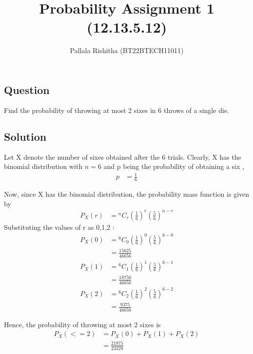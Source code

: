 \documentclass[12pt,twocolumn,notitlepage]{article}
\title{Probability Assignment 1 (12.13.5.12)}
\author{Pallala Rishitha (BT22BTECH11011)}
\date{}
\providecommand{\brak}[1]{\ensuremath{\left(#1\right)}}
\newcommand*{\comb}[2]{{}^{#1}C_{#2}}
\begin{document}
\maketitle
\subsection*{Question}
Find the probability of throwing at most 2 sixes in 6 throws of a single die.\\



\subsection*{Solution}

Let X denote the number of sixes obtained after the 6 trials. Clearly, X has the binomial distribution with $n=6$ and p being the probability of obtaining a six ,
\begin{align}
    p &= \frac{1}{6}      
\end{align}

Now, since X has the binomial distribution, the probability mass function is given by
\begin{align}
    P_X\brak{r} &= \comb{n}{r}\brak{\frac{1}{6}}^{r}\brak{\frac{5}{6}}^{n-r} 
\end{align}
Substituting the values of r as 0,1,2 :
\begin{align}
    P_X\brak{0} &= \comb{6}{0}\brak{\frac{1}{6}}^{0}\brak{\frac{5}{6}}^{6-0} 
\\
   &=\frac{15625}{46656}
\end{align}
\begin{align}
    P_X\brak{1} &= \comb{6}{1}\brak{\frac{1}{6}}^{1}\brak{\frac{5}{6}}^{6-1} 
\\
   &=\frac{18750}{46656}
\end{align}
\begin{align}
    P_X\brak{2} &= \comb{6}{2}\brak{\frac{1}{6}}^{2}\brak{\frac{5}{6}}^{6-2} 
\\
   &=\frac{9375}{46656}
\end{align}


Hence, the probability of throwing at most 2 sixes is
\begin{align}
    P_X\brak{<=2} &= P_X\brak{0} + P_X\brak{1} + P_X\brak{2}  \\
    &= \frac{21875}{23328} 
\end{align}
\end{document}
